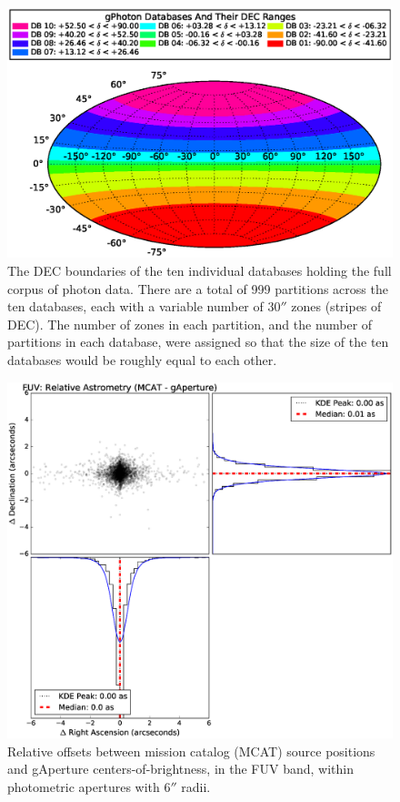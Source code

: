 \documentclass[preprint]{aastex}
\begin{document}
\clearpage

\begin{figure}
\includegraphics[scale=0.9]{Fig01.eps}
\caption{The DEC boundaries of the ten individual databases holding the full corpus of photon data. There are a total of 999 partitions across the ten databases, each with a variable number of $30''$ zones (stripes of DEC).  The number of zones in each partition, and the number of partitions in each database, were assigned so that the size of the ten databases would be roughly equal to each other. \label{dbdist}}
\end{figure}


\begin{figure}
\includegraphics[scale=0.65]{Fig02.eps}
\caption{Relative offsets between mission catalog (MCAT) source positions and gAperture centers-of-brightness, in the FUV band, within photometric apertures with $6''$ radii.
\label{fuvastrometry}}
\end{figure}
\end{document}
